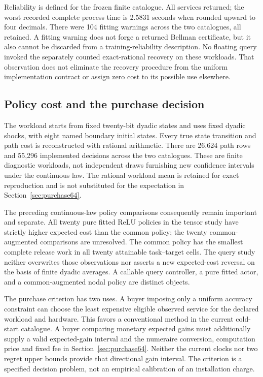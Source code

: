 Reliability is defined for the frozen finite catalogue. All services returned; the worst recorded complete process time is 2.5831 seconds when rounded upward to four decimals. There were 104 fitting warnings across the two catalogues, all retained. A fitting warning does not forge a returned Bellman certificate, but it also cannot be discarded from a training-reliability description. No floating query invoked the separately counted exact-rational recovery on these workloads. That observation does not eliminate the recovery procedure from the uniform implementation contract or assign zero cost to its possible use elsewhere.

\subsection{Policy cost and the purchase decision}
The workload starts from fixed twenty-bit dyadic states and uses fixed dyadic shocks, with eight named boundary initial states. Every true state transition and path cost is reconstructed with rational arithmetic. There are 26,624 path rows and 55,296 implemented decisions across the two catalogues. These are finite diagnostic workloads, not independent draws furnishing new confidence intervals under the continuous law. The rational workload mean is retained for exact reproduction and is not substituted for the expectation in Section~\ref{sec:purchase64}.

The preceding continuous-law policy comparisons consequently remain important and separate. All twenty pure fitted ReLU policies in the tensor study have strictly higher expected cost than the common policy; the twenty common-augmented comparisons are unresolved. The common policy has the smallest complete release work in all twenty attainable task--target cells. The query study neither overwrites those observations nor asserts a new expected-cost reversal on the basis of finite dyadic averages. A callable query controller, a pure fitted actor, and a common-augmented nodal policy are distinct objects.

The purchase criterion has two uses. A buyer imposing only a uniform accuracy constraint can choose the least expensive eligible observed service for the declared workload and hardware. This favors a conventional method in the current cold-start catalogue. A buyer comparing monetary expected gains must additionally supply a valid expected-gain interval and the numeraire conversion, computation price and fixed fee in Section~\ref{sec:purchase64}. Neither the current clocks nor two regret upper bounds provide that directional gain interval. The criterion is a specified decision problem, not an empirical calibration of an installation charge.

